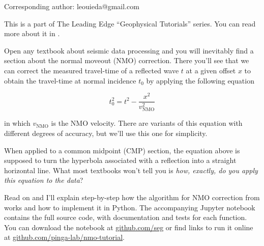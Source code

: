 Corresponding author: leouieda@gmail.com

This is a part of The Leading Edge ``Geophysical Tutorials'' series.
You can read more about it in \citet{Hall_2016a}.

Open any textbook about seismic data processing and you will inevitably find a
section about the normal moveout (NMO) correction.
There you'll see that we can correct the measured travel-time of a reflected
wave $t$ at a given offset $x$ to obtain the travel-time at normal
incidence $t_0$ by applying the following equation

\begin{equation}
t_0^2=t^2-\dfrac{x^2}{v_\mathrm{NMO}^2}
\label{eq:traveltime}
\end{equation}

in which $v_\mathrm{NMO}$ is the NMO velocity.
There are variants of this equation with different degrees of accuracy,
but we'll use this one for simplicity.

When applied to a common midpoint (CMP) section, the equation above is
supposed to turn the hyperbola associated with a reflection into a straight
horizontal line.
What most textbooks won't tell you is \textit{how, exactly, do you apply this
equation to the data}?

Read on and I'll explain step-by-step how the algorithm for NMO correction from
\citet{Yilmaz_2001} works and how to implement it in Python.
The accompanying Jupyter notebook \citep{Perez_2007} contains the full source
code, with documentation and tests for each function.
You can download the notebook at
\href{https://github.com/seg}{github.com/seg} or
find links to run it online at
\href{https://github.com/pinga-lab/nmo-tutorial}{github.com/pinga-lab/nmo-tutorial}.
